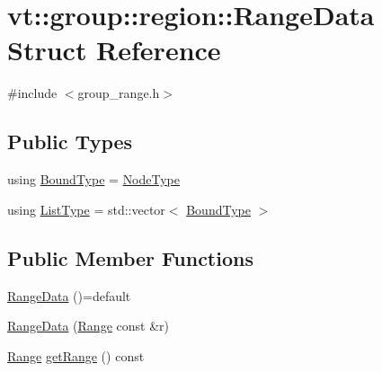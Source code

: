 \hypertarget{structvt_1_1group_1_1region_1_1_range_data}{}\section{vt\+:\+:group\+:\+:region\+:\+:Range\+Data Struct Reference}
\label{structvt_1_1group_1_1region_1_1_range_data}


{\ttfamily \#include $<$group\+\_\+range.\+h$>$}

\subsection*{Public Types}
\begin{DoxyCompactItemize}
\item 
using \hyperlink{structvt_1_1group_1_1region_1_1_range_data_a12ca75365c79bece7d169149b354011d}{Bound\+Type} = \hyperlink{namespacevt_a866da9d0efc19c0a1ce79e9e492f47e2}{Node\+Type}
\item 
using \hyperlink{structvt_1_1group_1_1region_1_1_range_data_a2450bd305df0f74edca0a864a3d21017}{List\+Type} = std\+::vector$<$ \hyperlink{structvt_1_1group_1_1region_1_1_range_data_a12ca75365c79bece7d169149b354011d}{Bound\+Type} $>$
\end{DoxyCompactItemize}
\subsection*{Public Member Functions}
\begin{DoxyCompactItemize}
\item 
\hyperlink{structvt_1_1group_1_1region_1_1_range_data_a8b5df2211262d2886fa3a1dbc915cbe3}{Range\+Data} ()=default
\item 
\hyperlink{structvt_1_1group_1_1region_1_1_range_data_a9b05605529f68b98c51a425921e038cd}{Range\+Data} (\hyperlink{structvt_1_1group_1_1region_1_1_range}{Range} const \&r)
\item 
\hyperlink{structvt_1_1group_1_1region_1_1_range}{Range} \hyperlink{structvt_1_1group_1_1region_1_1_range_data_a65d153d9024c2628e6f309abc28e2ffc}{get\+Range} () const
\end{DoxyCompactItemize}

